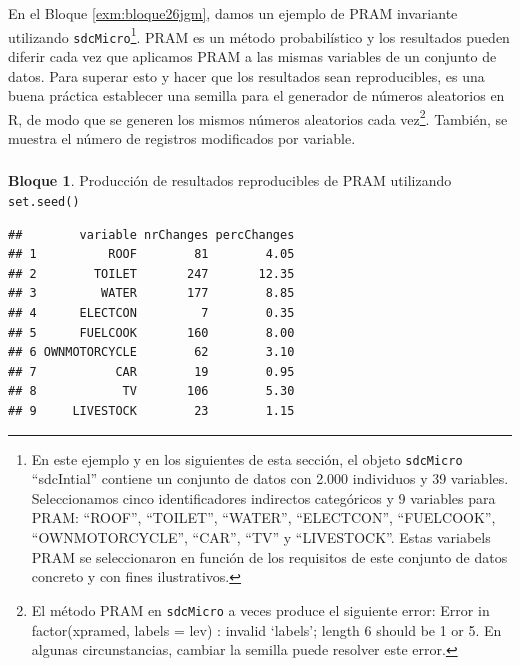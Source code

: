 \documentclass[]{book}
\newenvironment{Shaded}{\begin{snugshade}}{\end{snugshade}}
\newcommand{\CommentTok}[1]{\textcolor[rgb]{0.56,0.35,0.01}{\textit{#1}}}
\newcommand{\DataTypeTok}[1]{\textcolor[rgb]{0.13,0.29,0.53}{#1}}
\newcommand{\DecValTok}[1]{\textcolor[rgb]{0.00,0.00,0.81}{#1}}
\newcommand{\KeywordTok}[1]{\textcolor[rgb]{0.13,0.29,0.53}{\textbf{#1}}}
\newcommand{\NormalTok}[1]{#1}
\newcommand{\OperatorTok}[1]{\textcolor[rgb]{0.81,0.36,0.00}{\textbf{#1}}}
\newcommand{\StringTok}[1]{\textcolor[rgb]{0.31,0.60,0.02}{#1}}
\theoremstyle{definition}
\theoremstyle{definition}
\newtheorem{example}{Bloque}[chapter]
\theoremstyle{definition}
\theoremstyle{definition}
\theoremstyle{remark}
\begin{document}
En el Bloque \ref{exm:bloque26jgm}, damos un ejemplo de PRAM invariante utilizando \texttt{sdcMicro}\footnote{En este ejemplo y en los siguientes de esta sección, el objeto \texttt{sdcMicro} ``sdcIntial'' contiene un conjunto de datos con 2.000 individuos y 39 variables. Seleccionamos cinco identificadores indirectos categóricos y 9 variables para PRAM: ``ROOF'', ``TOILET'', ``WATER'', ``ELECTCON'', ``FUELCOOK'', ``OWNMOTORCYCLE'', ``CAR'', ``TV'' y ``LIVESTOCK''. Estas variabels PRAM se seleccionaron en función de los requisitos de este conjunto de datos concreto y con fines ilustrativos.}. PRAM es un método probabilístico y los resultados pueden diferir cada vez que aplicamos PRAM a las mismas variables de un conjunto de datos. Para superar esto y hacer que los resultados sean reproducibles, es una buena práctica establecer una semilla para el generador de números aleatorios en R, de modo que se generen los mismos números aleatorios cada vez\footnote{El método PRAM en \texttt{sdcMicro} a veces produce el siguiente error: Error in factor(xpramed, labels = lev) : invalid `labels'; length 6 should be 1 or 5. En algunas circunstancias, cambiar la semilla puede resolver este error.}. También, se muestra el número de registros modificados por variable.

\hypertarget{section}{%
\subsubsection{}\label{section}}

\begin{example}
\protect\hypertarget{exm:bloque26jgm}{}{\label{exm:bloque26jgm} }Producción de resultados reproducibles de PRAM utilizando \texttt{set.seed()}
\end{example}

\begin{Shaded}
\end{Shaded}

\begin{verbatim}
##        variable nrChanges percChanges
## 1          ROOF        81        4.05
## 2        TOILET       247       12.35
## 3         WATER       177        8.85
## 4      ELECTCON         7        0.35
## 5      FUELCOOK       160        8.00
## 6 OWNMOTORCYCLE        62        3.10
## 7           CAR        19        0.95
## 8            TV       106        5.30
## 9     LIVESTOCK        23        1.15
\end{verbatim}
\end{document}
